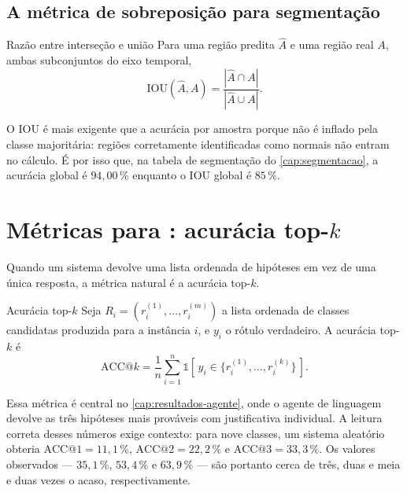 \subsection{A métrica de sobreposição para segmentação}

\begin{definicao}{Razão entre interseção e união}
Para uma região predita $\hat{A}$ e uma região real $A$, ambas subconjuntos do eixo
temporal,
\begin{equation}
  \text{IOU}(\hat{A}, A) = \frac{|\hat{A} \cap A|}{|\hat{A} \cup A|}.
  \label{eq:iou}
\end{equation}
\end{definicao}

O IOU é mais exigente que a acurácia por amostra porque não é inflado pela classe
majoritária: regiões corretamente identificadas como normais não entram no cálculo. É
por isso que, na tabela de segmentação do \cref{cap:segmentacao}, a acurácia global é
$94{,}00\,\%$ enquanto o IOU global é $85\,\%$.

\section{Métricas para : acurácia top-$k$}

Quando um sistema devolve uma lista ordenada de hipóteses em vez de uma única resposta,
a métrica natural é a acurácia top-$k$.

\begin{definicao}{Acurácia top-$k$}
Seja $R_i = (r_i^{(1)}, \dots, r_i^{(m)})$ a lista ordenada de classes candidatas
produzida para a instância $i$, e $y_i$ o rótulo verdadeiro. A acurácia top-$k$ é
\begin{equation}
  \text{ACC}@k = \frac{1}{n} \sum_{i=1}^{n}
  \mathbb{1}\!\left[\, y_i \in \{ r_i^{(1)}, \dots, r_i^{(k)} \} \,\right].
  \label{eq:topk}
\end{equation}
\end{definicao}

Essa métrica é central no \cref{cap:resultados-agente}, onde o agente de linguagem
devolve as três hipóteses mais prováveis com justificativa individual. A leitura
correta desses números exige contexto: para nove classes, um sistema aleatório obteria
$\text{ACC}@1 = 11{,}1\,\%$, $\text{ACC}@2 = 22{,}2\,\%$ e
$\text{ACC}@3 = 33{,}3\,\%$. Os valores observados --- $35{,}1\,\%$, $53{,}4\,\%$ e
$63{,}9\,\%$ --- são portanto cerca de três, duas e meia e duas vezes o acaso,
respectivamente.

